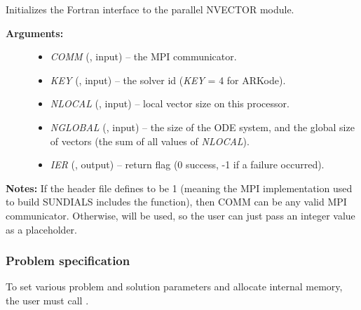 \documentclass[letterpaper,10pt,english]{sphinxmanual}
\begin{document}
\begin{fulllineitems}
\label{f_interface/Usage:f/_/FNVINITP}
Initializes the Fortran interface to the parallel NVECTOR module.
\begin{description}
\item[{\textbf{Arguments:}}] \leavevmode\begin{itemize}
\item {} 
\emph{COMM} (, input) -- the MPI communicator.

\item {} 
\emph{KEY} (, input) -- the solver id (\emph{KEY} = 4 for ARKode).

\item {} 
\emph{NLOCAL} (, input) -- local vector size on this processor.

\item {} 
\emph{NGLOBAL} (, input) -- the size of the ODE system,
and the global size of vectors (the sum of all values of \emph{NLOCAL}).

\item {} 
\emph{IER} (, output) -- return flag (0 success, -1 if a
failure occurred).

\end{itemize}

\end{description}

\textbf{Notes:} If the header file  defines
 to be 1 (meaning the MPI implementation
used to build SUNDIALS includes the  function),
then COMM can be any valid MPI communicator.  Otherwise,
 will be used, so the user can just pass an
integer value as a placeholder.

\end{fulllineitems}



\subsubsection{Problem specification}
\label{f_interface/Usage:problem-specification}\label{f_interface/Usage:finterface-problem}
To set various problem and solution parameters and allocate internal
memory, the user must call {\hyperref[f_interface/Usage:f/_/FARKMALLOC]{\emph{}}}.
\end{document}
